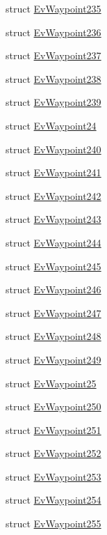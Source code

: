 \begin{DoxyCompactItemize}
\item 
struct \hyperlink{structsmacc_1_1EvWaypoint235}{Ev\+Waypoint235}
\item 
struct \hyperlink{structsmacc_1_1EvWaypoint236}{Ev\+Waypoint236}
\item 
struct \hyperlink{structsmacc_1_1EvWaypoint237}{Ev\+Waypoint237}
\item 
struct \hyperlink{structsmacc_1_1EvWaypoint238}{Ev\+Waypoint238}
\item 
struct \hyperlink{structsmacc_1_1EvWaypoint239}{Ev\+Waypoint239}
\item 
struct \hyperlink{structsmacc_1_1EvWaypoint24}{Ev\+Waypoint24}
\item 
struct \hyperlink{structsmacc_1_1EvWaypoint240}{Ev\+Waypoint240}
\item 
struct \hyperlink{structsmacc_1_1EvWaypoint241}{Ev\+Waypoint241}
\item 
struct \hyperlink{structsmacc_1_1EvWaypoint242}{Ev\+Waypoint242}
\item 
struct \hyperlink{structsmacc_1_1EvWaypoint243}{Ev\+Waypoint243}
\item 
struct \hyperlink{structsmacc_1_1EvWaypoint244}{Ev\+Waypoint244}
\item 
struct \hyperlink{structsmacc_1_1EvWaypoint245}{Ev\+Waypoint245}
\item 
struct \hyperlink{structsmacc_1_1EvWaypoint246}{Ev\+Waypoint246}
\item 
struct \hyperlink{structsmacc_1_1EvWaypoint247}{Ev\+Waypoint247}
\item 
struct \hyperlink{structsmacc_1_1EvWaypoint248}{Ev\+Waypoint248}
\item 
struct \hyperlink{structsmacc_1_1EvWaypoint249}{Ev\+Waypoint249}
\item 
struct \hyperlink{structsmacc_1_1EvWaypoint25}{Ev\+Waypoint25}
\item 
struct \hyperlink{structsmacc_1_1EvWaypoint250}{Ev\+Waypoint250}
\item 
struct \hyperlink{structsmacc_1_1EvWaypoint251}{Ev\+Waypoint251}
\item 
struct \hyperlink{structsmacc_1_1EvWaypoint252}{Ev\+Waypoint252}
\item 
struct \hyperlink{structsmacc_1_1EvWaypoint253}{Ev\+Waypoint253}
\item 
struct \hyperlink{structsmacc_1_1EvWaypoint254}{Ev\+Waypoint254}
\item 
struct \hyperlink{structsmacc_1_1EvWaypoint255}{Ev\+Waypoint255}
\item 

\end{DoxyCompactItemize}
